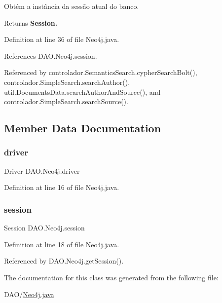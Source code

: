 Obtém a instância da sessão atual do banco.

\begin{DoxyReturn}{Returns}
{\bfseries Session.} 
\end{DoxyReturn}


Definition at line 36 of file Neo4j.\+java.



References D\+A\+O.\+Neo4j.\+session.



Referenced by controlador.\+Semantics\+Search.\+cypher\+Search\+Bolt(), controlador.\+Simple\+Search.\+search\+Author(), util.\+Documents\+Data.\+search\+Author\+And\+Source(), and controlador.\+Simple\+Search.\+search\+Source().



\subsection{Member Data Documentation}
\hypertarget{classDAO_1_1Neo4j_ae39f48e933894d2bc2c742a1e6f39fa7}{}\label{classDAO_1_1Neo4j_ae39f48e933894d2bc2c742a1e6f39fa7} 
\subsubsection{\texorpdfstring{driver}{driver}}
{\footnotesize\ttfamily Driver D\+A\+O.\+Neo4j.\+driver\hspace{0.3cm}{\ttfamily [private]}}



Definition at line 16 of file Neo4j.\+java.

\hypertarget{classDAO_1_1Neo4j_a504ee636d54273588fb7dd480c7bb1ee}{}\label{classDAO_1_1Neo4j_a504ee636d54273588fb7dd480c7bb1ee} 
\subsubsection{\texorpdfstring{session}{session}}
{\footnotesize\ttfamily Session D\+A\+O.\+Neo4j.\+session\hspace{0.3cm}{\ttfamily [private]}}



Definition at line 18 of file Neo4j.\+java.



Referenced by D\+A\+O.\+Neo4j.\+get\+Session().



The documentation for this class was generated from the following file\+:\begin{DoxyCompactItemize}
\item 
D\+A\+O/\hyperlink{Neo4j_8java}{Neo4j.\+java}\end{DoxyCompactItemize}
